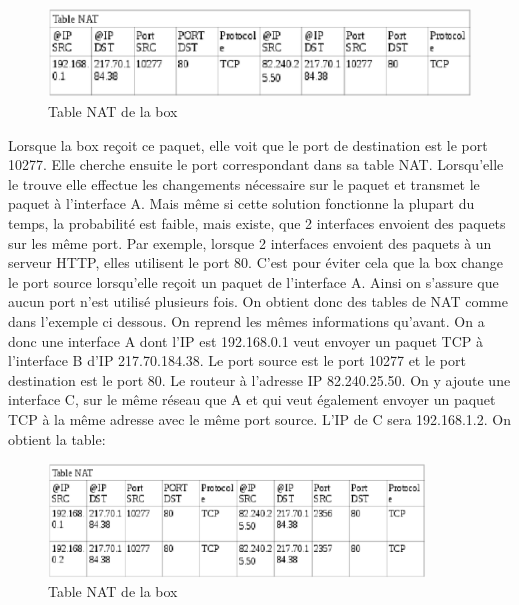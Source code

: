 \begin{figure}[h]
\centering
\includegraphics[width=12cm]{./pics/TableNAT1.eps}
\caption{Table NAT de la box}
\label{fig:NAT1}
\end{figure}

Lorsque la box reçoit ce paquet, elle voit que le port de destination est le
port 10277. Elle cherche ensuite le port correspondant dans sa table NAT.
Lorsqu'elle le trouve elle effectue les changements nécessaire sur le paquet et
transmet le paquet à l'interface A.
\newline
Mais même si cette solution fonctionne la plupart du temps, la probabilité est
faible, mais existe, que 2 interfaces envoient des paquets sur les même port. Par exemple,
lorsque 2 interfaces envoient des paquets à un serveur HTTP, elles utilisent le port 80. 
C'est pour éviter cela que la box change le port source lorsqu'elle reçoit un paquet de
l'interface A. Ainsi on s'assure que aucun port n'est utilisé plusieurs fois.
On obtient donc des tables de NAT comme dans l'exemple ci dessous.
\newline
On reprend les mêmes informations qu'avant. On a donc une interface A dont l'IP
est 192.168.0.1 veut envoyer un paquet TCP à l'interface B d'IP 217.70.184.38.
Le port source est le port 10277 et le port destination est le port 80. Le
routeur à l'adresse IP  82.240.25.50.
On y ajoute une interface C, sur le même réseau que A et qui veut également
envoyer un paquet TCP à la même adresse avec le même port source. L'IP de C
sera 192.168.1.2.
On obtient la table:

\begin{figure}[h]
\centering
\includegraphics[width=10cm]{./pics/TableNAT2.eps}
\caption{Table NAT de la box}
\label{fig:NAT2}
\end{figure}

